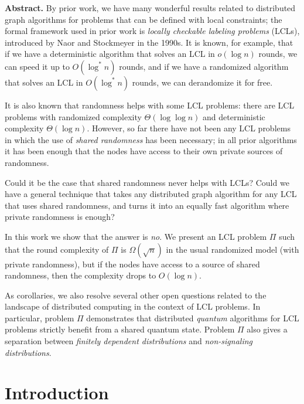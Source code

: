\documentclass[11pt]{article}
\newenvironment{myabstract}{\list{}{\listparindent 1.5em
        \itemindent    \listparindent
        \leftmargin    1cm
        \rightmargin   1cm
        \parsep        0pt}\item\relax}{\endlist}
\begin{document}
\begin{myabstract}
\noindent\textbf{Abstract.}
By prior work, we have many wonderful results related to distributed graph algorithms for problems that can be defined with local constraints; the formal framework used in prior work is \emph{locally checkable labeling problems} (LCLs), introduced by Naor and Stockmeyer in the 1990s. It is known, for example, that if we have a deterministic algorithm that solves an LCL in $o(\log n)$ rounds, we can speed it up to $O(\log^* n)$ rounds, and if we have a randomized algorithm that solves an LCL in $O(\log^* n)$ rounds, we can derandomize it for free.

It is also known that randomness helps with some LCL problems: there are LCL problems with randomized complexity $\Theta(\log \log n)$ and deterministic complexity $\Theta(\log n)$. However, so far there have not been any LCL problems in which the use of \emph{shared randomness} has been necessary; in all prior algorithms it has been enough that the nodes have access to their own private sources of randomness.

Could it be the case that shared randomness never helps with LCLs? Could we have a general technique that takes any distributed graph algorithm for any LCL that uses shared randomness, and turns it into an equally fast algorithm where private randomness is enough?

In this work we show that the answer is \emph{no}. We present an LCL problem $\Pi$ such that the round complexity of $\Pi$ is $\Omega(\sqrt{n})$ in the usual randomized \local model (with private randomness), but if the nodes have access to a source of shared randomness, then the complexity drops to $O(\log n)$.

As corollaries, we also resolve several other open questions related to the landscape of distributed computing in the context of LCL problems. In particular, problem $\Pi$ demonstrates that distributed \emph{quantum} algorithms for LCL problems strictly benefit from a shared quantum state. Problem $\Pi$ also gives a separation between \emph{finitely dependent distributions} and \emph{non-signaling distributions}.
\end{myabstract}

\thispagestyle{empty}
\setcounter{page}{0}
\clearpage

\section{Introduction}
\end{document}
